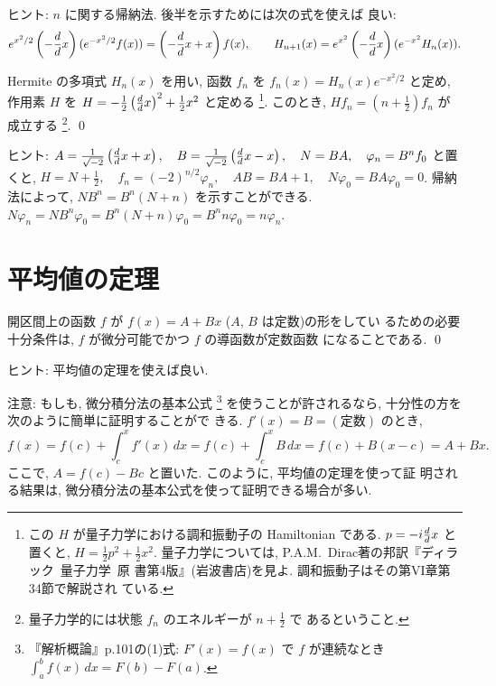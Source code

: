 \documentclass[12pt,twoside]{jarticle}
\begin{document}
\noindent ヒント: $n$ に関する帰納法. 後半を示すためには次の式を使えば
良い:
\[
  e^{x^2/2} \left( - \frac{d}{d }{x} \right) ( e^{-x^2/2} f(x) )
  = \left( - \frac{d}{d }{x} + x \right) f(x),
  \qquad
  H_{n+1}(x) = e^{x^2} \left( - \frac{d}{d }{x} \right)(e^{-x^2}H_n(x)).
\]

\begin{question}\qstar{*}
  Hermite の多項式 $H_n(x)$ を用い, %
  函数 $f_n$ を $f_n(x)=H_n(x)e^{-x^2/2}$ と定め, %
  作用素 $H$ を %
  \( 
    H = -\frac{1}{2}\left(\frac{d}{d }{x}\right)^2 + \frac{1}{2}x^2
  \) %
  と定める%
  \footnote{この $H$ が量子力学における調和振動子の Hamiltonian である.
    $p=-i\frac{d}{d }{x}$ と置くと, %
    $H = \frac{1}{2}p^2 + \frac{1}{2} x^2$. %
    量子力学については, P.A.M.~Dirac著の邦訳『ディラック\ 量子力学\ 原
    書第4版』(岩波書店)を見よ. 調和振動子はその第VI章第34節で解説され
    ている.}.
  このとき, %
  \( %
    Hf_n = \left( n + \frac{1}{2} \right)f_n
  \) %
  が成立する%
  \footnote{量子力学的には状態 $f_n$ のエネルギーが $n+\frac{1}{2}$ で
    あるということ.}. %
  \qed
\end{question}

\noindent ヒント: %
\( 
  A = \frac{1}{\sqrt{-2}} \left( \frac{d}{d }{x} + x \right), \quad
  B = \frac{1}{\sqrt{-2}} \left( \frac{d}{d }{x} - x \right), \quad
  N = B A, \quad
  \varphi_n = B^n f_0
\) %
と置くと, %
\break %
\( 
  H = N + \frac{1}{2}, \quad
  f_n = (-2)^{n/2} \varphi_n, \quad
  AB = BA + 1, \quad
  N \varphi_0 = B A \varphi_0 = 0
\). %
帰納法によって, %
\break %
\( %
  N B^n = B^n (N + n)
\) %
を示すことができる. %
\( %
  N \varphi_n = N B^n \varphi_0 = B^n(N + n) \varphi_0 
  = B^n n \varphi_0 = n \varphi_n
\).


\section{平均値の定理}

\begin{question}
  開区間上の函数 $f$ が $f(x) = A + B x$ ($A$, $B$ は定数)の形をしてい
  るための必要十分条件は, $f$ が微分可能でかつ $f$ の導函数が定数函数
  になることである.  \qed
\end{question}

\noindent ヒント: 平均値の定理を使えば良い. 

\noindent 注意: もしも, 微分積分法の基本公式%
\footnote{『解析概論』p.101の(1)式: $F'(x) = f(x)$ で $f$ が連続なとき %
  $\int_a^b f(x)\,dx = F(b) - F(a)$.}%
を使うことが許されるなら, 十分性の方を次のように簡単に証明することがで
きる. $f'(x) = B =(\text{定数})$ のとき,
\[
  f(x) = f(c) + \int_c^x f'(x)\,dx 
       = f(c) + \int_c^x B\,dx
       = f(c) + B (x - c)
       = A + B x.
\]%
ここで, $A = f(c) - B c$ と置いた. このように, 平均値の定理を使って証
明される結果は, 微分積分法の基本公式を使って証明できる場合が多い. 
\end{document}
